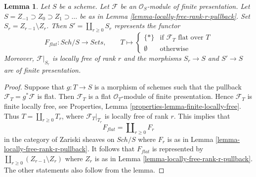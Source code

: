 \documentclass[10pt,a4paper]{amsart}
\theoremstyle{plain}
\newtheorem{lemma}[subsection]{Lemma}
\theoremstyle{definition}
\theoremstyle{remark}
\numberwithin{equation}{subsection}
\def\Sch{\mathit{Sch}}
\begin{document}
\begin{lemma}
\label{lemma-finite-presentation-module}
Let $S$ be a scheme. Let $\mathcal{F}$ be an $\mathcal{O}_S$-module
of finite presentation. Let $S = Z_{-1} \supset Z_0 \supset Z_1 \supset \ldots$
be as in Lemma \ref{lemma-locally-free-rank-r-pullback}.
Set $S_r = Z_{r - 1} \setminus Z_r$.
Then $S' = \coprod_{r \geq 0} S_r$ represents the functor
$$
F_{flat} : \Sch/S \longrightarrow \textit{Sets},\quad\quad
T \longmapsto
\left\{
\begin{matrix}
\{*\} & \text{if }\mathcal{F}_T\text{ flat over }T\\
\emptyset & \text{otherwise}
\end{matrix}
\right.
$$
Moreover, $\mathcal{F}|_{S_r}$ is locally free of rank $r$ and the
morphisms $S_r \to S$ and $S' \to S$ are of finite presentation.
\end{lemma}

\begin{proof}
Suppose that $g : T \to S$ is a morphism of schemes such that the pullback
$\mathcal{F}_T = g^*\mathcal{F}$ is flat. Then $\mathcal{F}_T$ is a flat
$\mathcal{O}_T$-module of finite presentation. Hence
$\mathcal{F}_T$ is finite locally free, see
Properties, Lemma \ref{properties-lemma-finite-locally-free}.
Thus $T = \coprod_{r \geq 0} T_r$, where $\mathcal{F}_T|_{T_r}$ is locally
free of rank $r$. This implies that
$$
F_{flat} = \coprod\nolimits_{r \geq 0} F_r
$$
in the category of Zariski sheaves on $\Sch/S$ where $F_r$ is as in
Lemma \ref{lemma-locally-free-rank-r-pullback}. It follows
that $F_{flat}$ is represented by
$\coprod_{r \geq 0} (Z_{r - 1} \setminus Z_r)$ where
$Z_r$ is as in
Lemma \ref{lemma-locally-free-rank-r-pullback}.
The other statements also follow from the lemma.
\end{proof}
\end{document}
